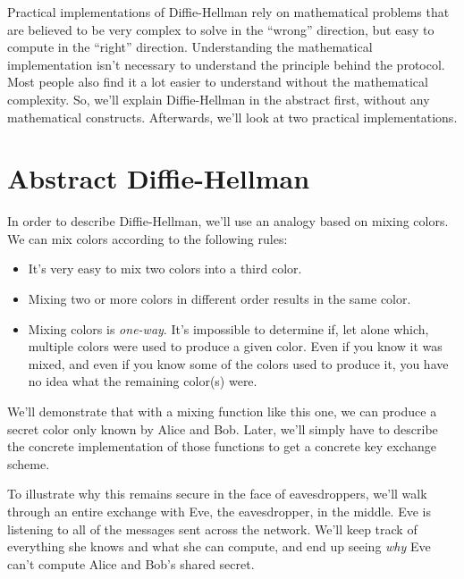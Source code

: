 \documentclass[11pt,ebook,table,dvipsnames]{memoir}
\begin{document}
Practical implementations of Diffie-Hellman rely on mathematical
problems that are believed to be very complex to solve in the \enquote{wrong}
direction, but easy to compute in the \enquote{right} direction. Understanding
the mathematical implementation isn't necessary to understand the
principle behind the protocol. Most people also find it a lot easier
to understand without the mathematical complexity. So, we'll explain
Diffie-Hellman in the abstract first, without any mathematical
constructs. Afterwards, we'll look at two practical implementations.
\section{Abstract Diffie-Hellman\label{Diffie-Hellman}}
\label{sec-2-4-2}

In order to describe Diffie-Hellman, we'll use an analogy based on
mixing colors. We can mix colors according to the following rules:

\begin{itemize}
\item It's very easy to mix two colors into a third color.
\item Mixing two or more colors in different order results in the same
color.
\item Mixing colors is \emph{one-way}. It's impossible to determine if, let
alone which, multiple colors were used to produce a given color.
Even if you know it was mixed, and even if you know some of the
colors used to produce it, you have no idea what the remaining
color(s) were.
\end{itemize}

We'll demonstrate that with a mixing function like this one, we can
produce a secret color only known by Alice and Bob. Later, we'll
simply have to describe the concrete implementation of those
functions to get a concrete key exchange scheme.

To illustrate why this remains secure in the face of eavesdroppers,
we'll walk through an entire exchange with Eve, the eavesdropper, in
the middle. Eve is listening to all of the messages sent across the
network. We'll keep track of everything she knows and what she can
compute, and end up seeing \emph{why} Eve can't compute Alice and Bob's
shared secret.

\newcommand{\dhimg}[1] {
\raisebox{-0.5\height}{\texttt{[image: ./Illustrations/DiffieHellman/\#1.pdf]}}
}

\newcommand{\dhmix}[4] {
\begin{figure}[ht!]
\centering
\dhimg{#1}
\dhimg{#2}
\dhimg{Plus}
\dhimg{#3}
\dhimg{Equals}
\dhimg{#4}
\end{figure}
}
\end{document}
